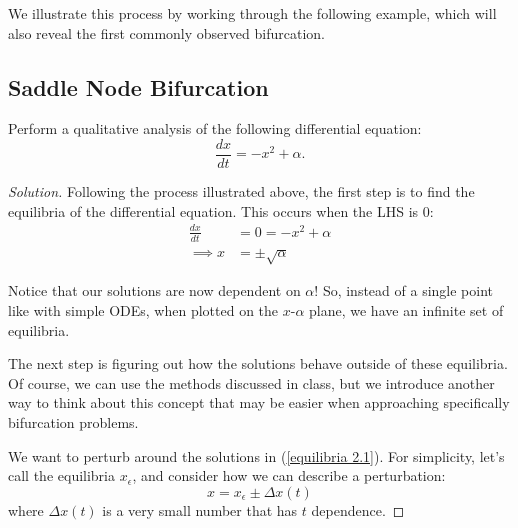 \documentclass{article}
\theoremstyle{definition}
\theoremstyle{remark}
\newenvironment{problem}[2][Example]{\begin{trivlist}
\item[\hskip \labelsep {\bfseries #1}\hskip \labelsep {\bfseries #2.}]}{\end{trivlist}}
\begin{document}
We illustrate this process by working through the following example, which will also reveal the first commonly observed bifurcation.
\subsection{Saddle Node Bifurcation}
\begin{problem}{2.1.1}
Perform a qualitative analysis of the following differential equation:
\begin{equation}\label{example 2.1}
    \frac{dx}{dt} = -x^2 + \alpha .
\end{equation}
\end{problem}
\begin{proof}[Solution]\renewcommand{\qedsymbol}{}
Following the process illustrated above, the first step is to find the equilibria of the differential equation. This occurs when the LHS is $0$:
\begin{align}\label{equilibria 2.1}
    \frac{dx}{dt} &= 0 = -x^2 + \alpha \nonumber
    \\
    \implies x &= \boxed{\pm \sqrt{\alpha}}
\end{align}

Notice that our solutions are now dependent on $\alpha$! So, instead of a single point like with simple ODEs, when plotted on the $x$-$\alpha$ plane, we have an infinite set of equilibria. 

The next step is figuring out how the solutions behave outside of these equilibria. Of course, we can use the methods discussed in class, but we introduce another way to think about this concept that may be easier when approaching specifically bifurcation problems. 

We want to perturb around the solutions in (\ref{equilibria 2.1}). For simplicity, let's call the equilibria $x_\epsilon$, and consider how we can describe a perturbation:
\begin{equation}
    x = x_\epsilon \pm \Delta x(t)    
\end{equation}
where $\Delta x(t)$ is a very small number that has $t$ dependence.


\end{proof}
\end{document}
